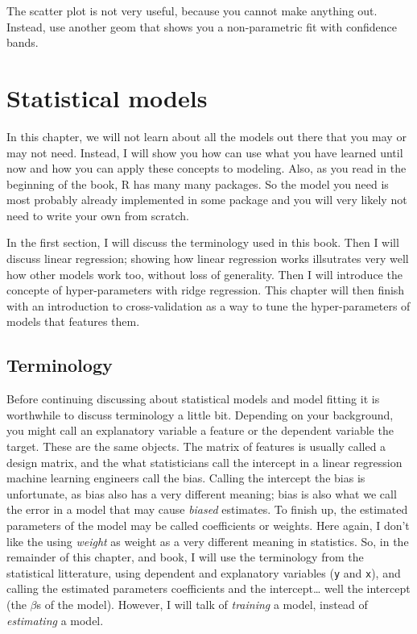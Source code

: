 \documentclass[]{gitbook}
\begin{document}
The scatter plot is not very useful, because you cannot make anything out. Instead, use another
geom that shows you a non-parametric fit with confidence bands.

\hypertarget{statistical-models}{%
\section{Statistical models}\label{statistical-models}}

In this chapter, we will not learn about all the models out there that you may or may not need.
Instead, I will show you how can use what you have learned until now and how you can apply these
concepts to modeling. Also, as you read in the beginning of the book, R has many many packages. So
the model you need is most probably already implemented in some package and you will very likely
not need to write your own from scratch.

In the first section, I will discuss the terminology used in this book. Then I will discuss
linear regression; showing how linear regression works illsutrates very well how other models
work too, without loss of generality. Then I will introduce the concepte of hyper-parameters
with ridge regression. This chapter will then finish with an introduction to cross-validation as
a way to tune the hyper-parameters of models that features them.

\hypertarget{terminology}{%
\subsection{Terminology}\label{terminology}}

Before continuing discussing about statistical models and model fitting it is worthwhile to discuss
terminology a little bit. Depending on your background, you might call an explanatory variable a
feature or the dependent variable the target. These are the same objects. The matrix of features
is usually called a design matrix, and the what statisticians call the intercept in a linear regression
machine learning engineers call the bias. Calling the intercept the bias is unfortunate, as bias
also has a very different meaning; bias is also what we call the error in a model that may cause
\emph{biased} estimates. To finish up, the estimated parameters of the model may be called coefficients
or weights. Here again, I don't like the using \emph{weight} as weight as a very different meaning in
statistics.
So, in the remainder of this chapter, and book, I will use the terminology from the statistical
litterature, using dependent and explanatory variables (\texttt{y} and \texttt{x}), and calling the
estimated parameters coefficients and the intercept\ldots{} well the intercept (the \(\beta\)s of the model).
However, I will talk of \emph{training} a model, instead of \emph{estimating} a model.
\end{document}
